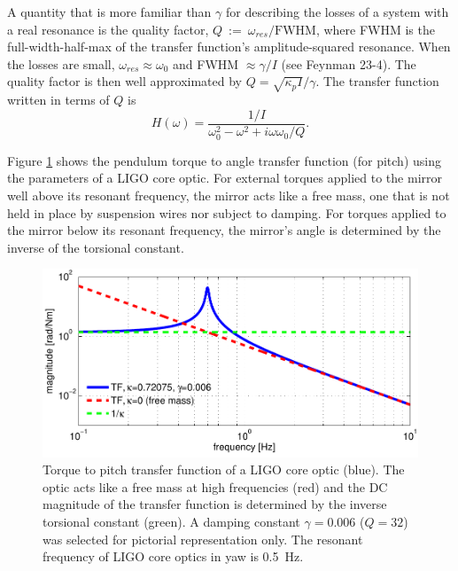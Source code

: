 A quantity that is more familiar than $\gamma$ for describing the losses of a system with a real resonance is the quality factor, $Q~:=~\omega_{res}/\mathrm{FWHM}$, where FWHM is the full-width-half-max of the transfer function's amplitude-squared resonance. When the losses are small, $\omega_{res} \approx \omega_0$ and FWHM $\approx \gamma/I$ (see Feynman 23-4). The quality factor is then well approximated by $Q = \sqrt{\kappa_p I}/\gamma$. The transfer function written in terms of $Q$ is \begin{equation} H(\omega) = \frac{1/I}{\omega_0^2 - \omega^2 + i \omega \omega_0 / Q}.  \label{eq:TFpendulum} \end{equation}

Figure \ref{fig:pendTF} shows the pendulum torque to angle transfer
function (for pitch) using the parameters of a LIGO core optic. For
external torques applied to the mirror well above its resonant frequency,
the mirror acts like a free mass, one that is not held in place by
suspension wires nor subject to damping. For torques applied to the
mirror below its resonant frequency, the mirror's angle is determined
by the inverse of the torsional constant.

\begin{figure}
\begin{centering}
\includegraphics[width=1.0\textwidth]{figures/pendTF.pdf}
\caption[Torque to pitch transfer function of a LIGO core
optic]{Torque to pitch transfer function of a LIGO core optic
  (blue). The optic acts like a free mass at high frequencies (red)
  and the DC magnitude of the transfer function is determined by the
  inverse torsional constant (green). A damping constant $\gamma =
  0.006$ ($Q=32$) was selected for pictorial representation only. The
  resonant frequency of LIGO core optics in yaw is 0.5~Hz.}
\label{fig:pendTF}
\end{centering}
\end{figure}





